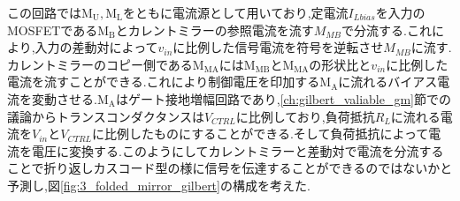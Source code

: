         この回路では$\mathrm{M_{U},M_{L}}$をともに電流源として用いており,定電流$I_{Lbias}$を入力のMOSFETである$\mathrm{M_{B}}$とカレントミラーの参照電流を流す$M_{MB}$で分流する.これにより,入力の差動対によって$v_{in}$に比例した信号電流を符号を逆転させ$M_{MB}$に流す.カレントミラーのコピー側である$\mathrm{M_{MA}}$には$\mathrm{M_{MB}}$と$\mathrm{M_{MA}}$の形状比と$v_{in}$に比例した電流を流すことができる.これにより制御電圧を印加する$\mathrm{M_{A}}$に流れるバイアス電流を変動させる.$\mathrm{M_{A}}$はゲート接地増幅回路であり,\ref{ch:gilbert_valiable_gm}節での議論からトランスコンダクタンスは$V_{CTRL}$に比例しており,負荷抵抗$R_{L}$に流れる電流を$V_{in}$と$V_{CTRL}$に比例したものにすることができる.そして負荷抵抗によって電流を電圧に変換する.このようにしてカレントミラーと差動対で電流を分流することで折り返しカスコード型の様に信号を伝達することができるのではないかと予測し,図\ref{fig:3_folded_mirror_gilbert}の構成を考えた.


